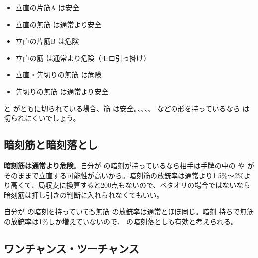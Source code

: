 \documentclass[../nankiru_main.tex]{subfiles}
\begin{document}
\begin{itemize}
\item {} 立直の片筋A  は安全
\item {} 立直の無筋  は通常より安全
\item {} 立直の片筋B  は危険
\item {} 立直の筋  は通常より危険（モロ引っ掛け）
\item {} 立直・先切りの無筋  は危険
\item {} 先切りの無筋  は通常より安全
\end{itemize}

 と  がともに切られている場合、筋  は安全\citep[][p. 165]{miinin-stat}。、、、、 などの形を持っているなら  は切られにくいでしょう。

\subsection{暗刻筋と暗刻落とし}

\textbf{暗刻筋は通常より危険}\citep[][pp. 166--167]{miinin-stat}。自分が  の暗刻が持っているなら相手は手牌の中の  や  がそのままで立直する可能性が高いから。暗刻筋の放銃率は通常より1.5\%〜2\%より高くて、局収支に換算すると200点もないので、ベタオリの場合ではないなら暗刻筋は押し引きの判断に入れられなくてもいい。

自分が  の暗刻を持っていても無筋  の放銃率は通常とほぼ同じ。暗刻  持ちで無筋  の放銃率は1\%しか増えていないので、 の暗刻落としも有効と考えられる\citep[][p. 168]{miinin-stat}。

\subsection{ワンチャンス・ツーチャンス}
\end{document}
